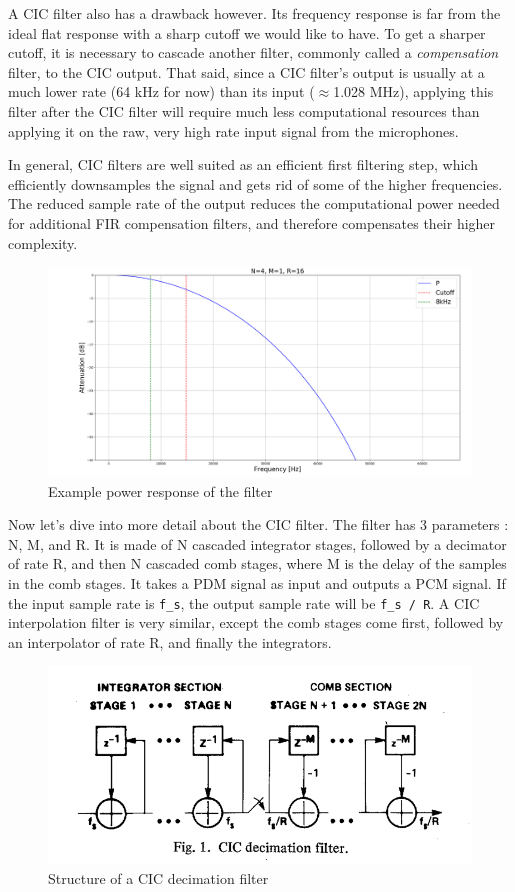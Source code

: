 \documentclass[]{report}
\begin{document}
A CIC filter also has a drawback however. Its frequency response is far from the ideal flat response with a sharp cutoff we would like to have. To get a sharper cutoff, it is necessary to cascade another filter, commonly called a \emph{compensation} filter, to the CIC output. That said, since a CIC filter's output is usually at a much lower rate (64 kHz for now) than its input ($ \approx $1.028 MHz), applying this filter after the CIC filter will require much less computational resources than applying it on the raw, very high rate input signal from the microphones.

In general, CIC filters are well suited as an efficient first filtering step, which efficiently downsamples the signal and gets rid of some of the higher frequencies. The reduced sample rate of the output reduces the computational power needed for additional FIR compensation filters, and therefore compensates their higher complexity.

\begin{figure}
\centering
\includegraphics[width=0.9\linewidth]{Pictures/CIC_power_resp.png}
\caption{Example power response of the filter}
\end{figure}

Now let's dive into more detail about the CIC filter. The filter has 3 parameters : N, M, and R. It is made of N cascaded integrator stages, followed by a decimator of rate R, and then N cascaded comb stages, where M is the delay of the samples in the comb stages. It takes a PDM signal as input and outputs a PCM signal. If the input sample rate is \texttt{f\_s}, the output sample rate will be \texttt{f\_s / R}. A CIC interpolation filter is very similar, except the comb stages come first, followed by an interpolator of rate R, and finally the integrators.

\begin{figure}[H]
\centering
\includegraphics[width=0.9\linewidth]{Pictures/CIC_structure.png}
\caption{Structure of a CIC decimation filter}
\end{figure}
\end{document}
